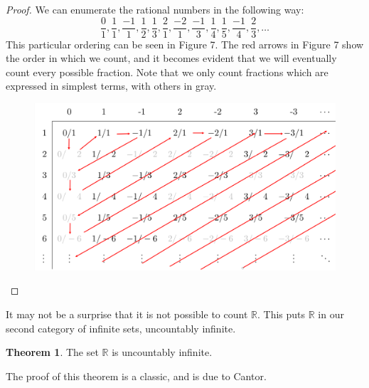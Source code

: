 \documentclass{article}
\newcommand{\R}{\mathbb{R}}
\theoremstyle{definition}
\newtheorem{theorem}{Theorem}[section]
\begin{document}
\begin{proof}
	We can enumerate the rational numbers in the following way: $$ \frac{0}{1},\frac{1}{1},\frac{-1}{1},\frac{1}{2}, \frac{1}{3}, \frac{2}{1}, \frac{-2}{1}, \frac{-1}{3}, \frac{1}{4}, \frac{1}{5}, \frac{-1}{4}, \frac{2}{3},\ldots $$ This particular ordering can be seen in Figure 7. The red arrows in Figure 7 show the order in which we count, and it becomes evident that we will eventually count every possible fraction. Note that we only count fractions which are expressed in simplest terms, with others in gray. 
\begin{figure}[h!]
	\centering
	\includegraphics[width=0.9\linewidth]{figures/Qcountable}
	\caption{}
	\label{fig:qcountable}
\end{figure}
\end{proof}
It may not be a surprise that it is not possible to count $ \R $. This puts $ \R $ in our second category of infinite sets, uncountably infinite.
\begin{theorem}
	The set $ \R $ is uncountably infinite. 
\end{theorem}
The proof of this theorem is a classic, and is due to Cantor. 
\end{document}
